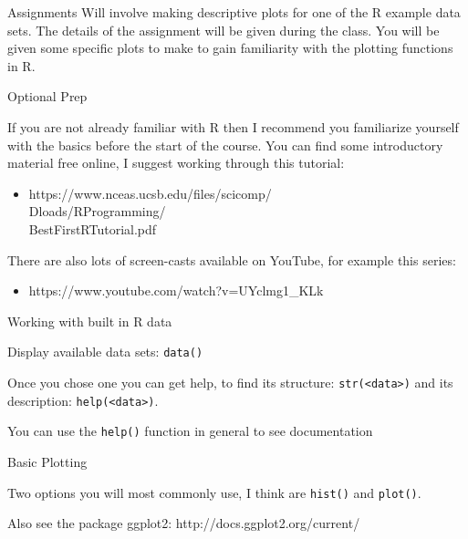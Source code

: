\documentclass{beamer}
\begin{document}
\begin{frame}{Assignments}
Will involve making descriptive plots for one of the R example data sets.  The details of the assignment will be given during the class.  You will be given some specific plots to make to gain familiarity with the plotting functions in R.

\end{frame}


\begin{frame}{Optional Prep}

If you are not already familiar with R then I recommend you familiarize yourself with the basics before the start of the course.  You can find some introductory material free online, I suggest working through this tutorial:

\begin{itemize}
\item https://www.nceas.ucsb.edu/files/scicomp/\\
Dloads/RProgramming/\\
BestFirstRTutorial.pdf
\end{itemize}

\noindent There are also lots of screen-casts available on YouTube, for example this series:

\begin{itemize}
\item https://www.youtube.com/watch?v=UYclmg1\_KLk
\end{itemize}


\end{frame}


\begin{frame}{Working with built in R data}

Display available data sets: \texttt{data()}

\vspace{5mm}

Once you chose one you can get help, to find its structure: \texttt{str(<data>)} and its description: \texttt{help(<data>)}.


\vspace{5mm}

You can use the \texttt{help()} function in general to see documentation
\end{frame}


\begin{frame}{Basic Plotting}

Two options you will most commonly use, I think are \texttt{hist()} and \texttt{plot()}.

\vspace{5mm}

Also see the package ggplot2: http://docs.ggplot2.org/current/


\end{frame}
\end{document}

